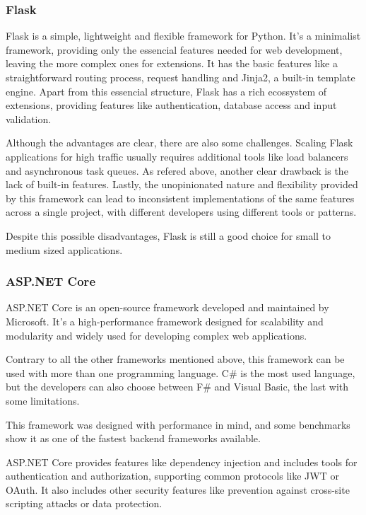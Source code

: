 \subsubsection{Flask}
Flask is a simple, lightweight and flexible framework for Python. It's a
minimalist framework, providing only the essencial features needed for
web development, leaving the more complex ones for extensions. It has the basic
features like a straightforward routing process, request handling and Jinja2,
a built-in template engine. Apart from this essencial structure, Flask has a
rich ecossystem of extensions, providing features like authentication,
database access and input validation.

Although the advantages are clear, there are also some challenges. Scaling
Flask applications for high traffic usually requires additional tools like load
balancers and asynchronous task queues. As refered above, another clear
drawback is the lack of built-in features. Lastly, the unopinionated nature and
flexibility provided by this framework can lead to inconsistent implementations
of the same features across a single project, with different developers using
different tools or patterns.

Despite this possible disadvantages, Flask is still a good choice for small to
medium sized applications.

\subsubsection{ASP.NET Core}
ASP.NET Core is an open-source framework developed and maintained by Microsoft.
It's a high-performance framework designed for scalability and modularity and
widely used for developing complex web applications.

Contrary to all the other frameworks mentioned above, this framework can be
used with more than one programming language. C\# is the most used language, but
the developers can also choose between F\# and Visual Basic, the last with some
limitations.

This framework was designed with performance in mind, and some benchmarks show
it as one of the fastest backend frameworks available.

ASP.NET Core provides features like dependency injection and includes tools for
authentication and authorization, supporting common protocols like JWT or OAuth.
It also includes other security features like prevention against cross-site
scripting attacks or data protection.

